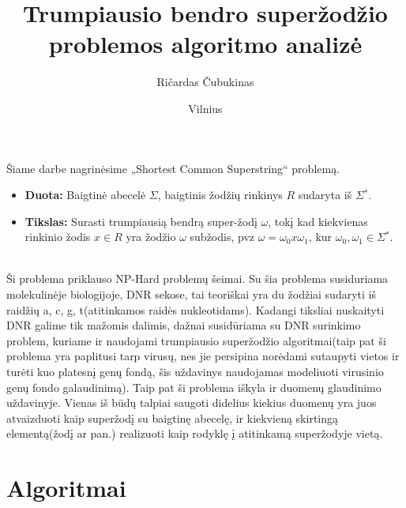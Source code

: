 \documentclass{VUMIFInfKursinis}
\institute{Informatikos institutas}
\title{Trumpiausio bendro superžodžio problemos algoritmo analizė}
\author{Ričardas Čubukinas}
\date{Vilnius \\ \the\year}
\begin{document}
\maketitle

\tableofcontents

Šiame darbe nagrinėsime „Shortest Common Superstring“ problemą.
\begin{itemize}
  \item{\textbf{Duota:} Baigtinė abecelė $\Sigma$, baigtinis žodžių rinkinys $R$ sudaryta iš $\Sigma{}^*$.}
  \item{\textbf{Tikslas:} Surasti trumpiausią bendrą super-žodį $\omega$, tokį kad kiekvienas rinkinio žodis $x \in R$ yra žodžio $\omega$ subžodis, pvz $\omega =\omega{}_0x\omega{}_1$, kur $\omega{}_0,\omega{}_1 \in \Sigma{}^*$.}
\end{itemize}\cite{ausiello1999complexity}\\

Ši problema priklauso NP-Hard problemų šeimai. Su šia problema susiduriama molekulinėje biologijoje, DNR sekose, tai teoriškai yra du žodžiai sudaryti iš raidžių {a, c, g, t}(atitinkamos raidės nukleotidams). Kadangi tiksliai nuskaityti DNR galime tik mažomis dalimis, dažnai susidūriama su DNR surinkimo problem, kuriame ir naudojami trumpiausio superžodžio algoritmai(taip pat ši problema yra paplitusi tarp virusų, nes jie persipina norėdami sutaupyti vietos ir turėti kuo platesnį genų fondą, šis uždavinys naudojamas modeliuoti virusinio genų fondo galaudinimą). Taip pat ši problema iškyla ir duomenų glaudinimo uždavinyje. Vienas iš būdų talpiai saugoti didelius kiekius duomenų yra juos atvaizduoti kaip superžodį su baigtinę abecelę, ir kiekvieną skirtingą elementą(žodį ar pan.) realizuoti kaip rodyklę į atitinkamą superžodyje vietą. \cite{ssparticle}


\section{Algoritmai}
\end{document}
